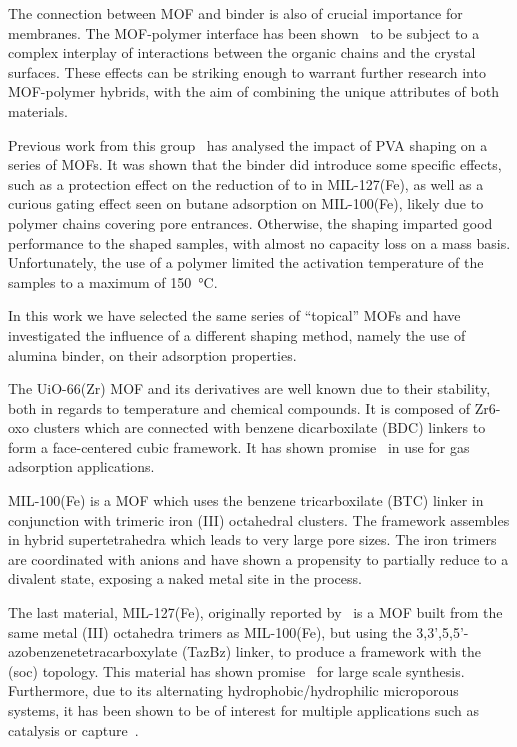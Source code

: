 The connection between MOF and binder is also of crucial importance for membranes.
The MOF-polymer interface has been shown~\cite{seminoMicroscopicModelMetal2016} to be
subject to a complex interplay of interactions between the organic chains and the
crystal surfaces. These effects can be striking enough to warrant further research
into MOF-polymer hybrids\cite{kitaoHybridizationMOFsPolymers2017}, with the aim of
combining the unique attributes of both materials.

Previous work from this group~\cite{chanutObservingEffectsShaping2016} has analysed the impact
of PVA shaping on a series of MOFs. It was shown that the binder did introduce
some specific effects, such as a protection effect on the reduction of  to
 in MIL-127(Fe), as well as a curious gating effect seen on butane adsorption
on MIL-100(Fe), likely due to polymer chains covering pore entrances. Otherwise, the
shaping imparted good performance to the shaped samples, with almost no capacity loss on
a mass basis. Unfortunately, the use of a polymer limited the activation temperature of the
samples to a maximum of \SI{150}{\degreeCelsius}.

In this work we have selected the same series of ``topical'' MOFs and have investigated the
influence of a different shaping method, namely the use of alumina binder, on their adsorption
properties.

The UiO-66(Zr) MOF and its derivatives are well known due to their stability, both in regards to
temperature and chemical compounds\cite{cavkaNewZirconiumInorganic2008}. It is composed of
Zr6-oxo clusters which are connected with benzene dicarboxilate (BDC) linkers to form
a face-centered cubic framework. It has shown promise~\cite{wiersumEvaluationUiO66GasBased2011}
in use for gas adsorption applications.

MIL-100(Fe) is a MOF which uses the benzene tricarboxilate (BTC) linker in conjunction
with trimeric iron (III) octahedral clusters.\cite{horcajadaSynthesisCatalyticProperties2007}
The framework assembles in hybrid supertetrahedra which leads to very large pore sizes.
The iron trimers are coordinated with
anions and have shown a propensity to partially reduce to a divalent  state, exposing
a naked metal site in the process.\cite{yoonControlledReducibilityMetalOrganic2010}

The last material, MIL-127(Fe), originally reported by~\citeauthor{liuAssemblyMetalOrganic2007} is
a MOF built from the same metal (III) octahedra trimers as MIL-100(Fe), but using the
3,3',5,5'-azobenzenetetracarboxylate (TazBz) linker, to produce a framework with the (soc)
topology. This material has shown promise~\cite{chevreauSynthesisBiocompatibleHighly2016}
for large scale synthesis. Furthermore, due to its alternating hydrophobic/hydrophilic
microporous systems, it has been shown to be of interest for multiple applications such
as catalysis or  capture~\cite{chanutScreeningEffectWater2017}.

